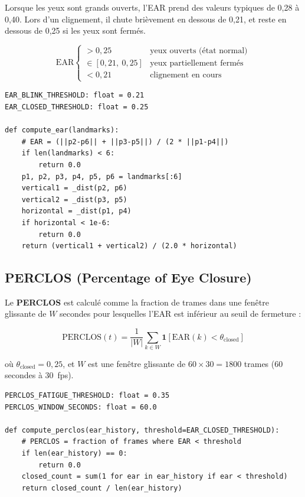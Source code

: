 \documentclass[12pt,a4paper]{report}
\begin{document}
Lorsque les yeux sont grands ouverts, l'EAR prend des valeurs typiques de 0,28 \`a 0,40. Lors d'un clignement, il chute bri\`evement en dessous de 0,21, et reste en dessous de 0,25 si les yeux sont ferm\'es.

\begin{equation}
  \text{EAR} \begin{cases}
    > 0{,}25 & \text{yeux ouverts (\'etat normal)} \\
    \in [0{,}21,\ 0{,}25] & \text{yeux partiellement ferm\'es} \\
    < 0{,}21 & \text{clignement en cours}
  \end{cases}
\end{equation}

\begin{lstlisting}[style=python, caption={Calcul de l'EAR (behavioral\_analysis.py)}, label=lst:ear]
EAR_BLINK_THRESHOLD: float = 0.21
EAR_CLOSED_THRESHOLD: float = 0.25

def compute_ear(landmarks):
    # EAR = (||p2-p6|| + ||p3-p5||) / (2 * ||p1-p4||)
    if len(landmarks) < 6:
        return 0.0
    p1, p2, p3, p4, p5, p6 = landmarks[:6]
    vertical1 = _dist(p2, p6)
    vertical2 = _dist(p3, p5)
    horizontal = _dist(p1, p4)
    if horizontal < 1e-6:
        return 0.0
    return (vertical1 + vertical2) / (2.0 * horizontal)
\end{lstlisting}

\subsection{PERCLOS (Percentage of Eye Closure)}

Le \textbf{PERCLOS} est calcul\'e comme la fraction de trames dans une fen\^etre glissante de $W$ secondes pour lesquelles l'EAR est inf\'erieur au seuil de fermeture :

\begin{equation}
  \text{PERCLOS}(t) = \frac{1}{|W|} \sum_{k \in W} \mathbf{1}[\text{EAR}(k) < \theta_{\text{closed}}]
  \label{eq:perclos}
\end{equation}

o\`u $\theta_{\text{closed}} = 0{,}25$, et $W$ est une fen\^etre glissante de $60 \times 30 = 1800$ trames (60 secondes \`a 30~fps).

\begin{lstlisting}[style=python, caption={Calcul du PERCLOS (behavioral\_analysis.py)}, label=lst:perclos]
PERCLOS_FATIGUE_THRESHOLD: float = 0.35
PERCLOS_WINDOW_SECONDS: float = 60.0

def compute_perclos(ear_history, threshold=EAR_CLOSED_THRESHOLD):
    # PERCLOS = fraction of frames where EAR < threshold
    if len(ear_history) == 0:
        return 0.0
    closed_count = sum(1 for ear in ear_history if ear < threshold)
    return closed_count / len(ear_history)
\end{lstlisting}
\end{document}
